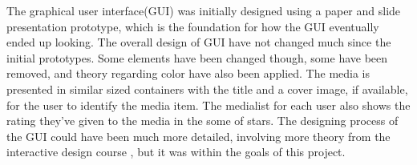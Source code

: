 The graphical user interface(GUI) was initially designed using a paper and slide presentation prototype, which is the foundation for how the GUI eventually ended up looking. The overall design of GUI have not changed much since the initial prototypes. Some elements have been changed though, some have been removed, and theory regarding color have also been applied. The media is presented in similar sized containers with the title and a cover image, if available, for the user to identify the media item. The medialist for each user also shows the rating they’ve given to the media in the some of stars. The designing process of the GUI could have been much more detailed, involving more theory from the interactive design course \cite{DEBBook}, but it was within the goals of this project.
